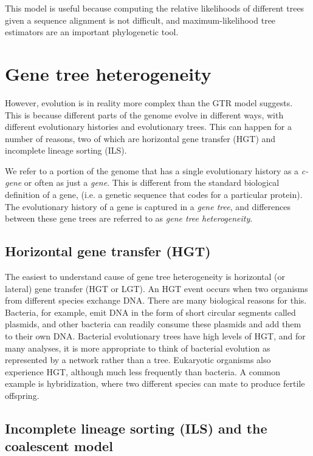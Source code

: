\documentclass[edeposit,fullpage]{uiucthesis2014}
\theoremstyle{definition}
\begin{document}
This model is useful because computing the relative likelihoods of
different trees given a sequence alignment is not difficult, and
maximum-likelihood tree estimators are an important phylogenetic tool.

\section{Gene tree heterogeneity}
\label{sec:heterogeneity}

However, evolution is in reality more complex than the GTR model
suggests. This is because different parts of the genome evolve in
different ways, with different evolutionary histories and evolutionary
trees. This can happen for a number of reasons, two of which are
horizontal gene transfer (HGT) and incomplete lineage sorting (ILS).

We refer to a portion of the genome that has a single evolutionary
history as a \emph{c-gene} or often as just a \emph{gene}. This is
different from the standard biological definition of a gene, (i.e. a
genetic sequence that codes for a particular protein). The
evolutionary history of a gene is captured in a \emph{gene tree}, and
differences between these gene trees are referred to as \emph{gene
  tree heterogeneity}.

\subsection{Horizontal gene transfer (HGT)}

The easiest to understand cause of gene tree heterogeneity is
horizontal (or lateral) gene transfer (HGT or LGT). An HGT event
occurs when two organisms from different species exchange DNA. There
are many biological reasons for this. Bacteria, for example, emit DNA
in the form of short circular segments called plasmids, and other
bacteria can readily consume these plasmids and add them to their own
DNA. Bacterial evolutionary trees have high levels of HGT, and for
many analyses, it is more appropriate to think of bacterial evolution
as represented by a network rather than a tree. Eukaryotic organisms
also experience HGT, although much less frequently than bacteria. A
common example is hybridization, where two different species can mate
to produce fertile offspring. 


\subsection{Incomplete lineage sorting (ILS) and the coalescent model}
\end{document}
